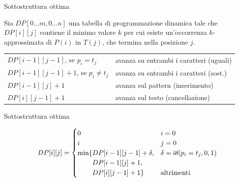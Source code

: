 \begin{frame}{Sottostruttura ottima}

\vspace{-9pt}
\begin{myboxtitle}[Definizione]
Sia $DP[0 \ldots m, 0 \ldots n]$ una tabella di programmazione dinamica
tale che $DP[i][j]$ contiene il minimo valore $k$ per cui esiste un'occorrenza $k$-approssimata di $P(i)$ in $T(j)$, che termina nella posizione $j$.
\end{myboxtitle}

\smallskip
\begin{tabular}{ll}
$DP[i-1][j-1]$, se $p_i = t_j$ &	avanza su entrambi i caratteri (uguali) \\
$DP[i-1][j-1]+1$, se $p_i \neq t_j$ &	avanza su entrambi i caratteri  (\alert{sost.}) \\
$DP[i-1][j]+1$				& avanza sul pattern (\alert{inserimento})\\
$DP[i][j-1]+1$				& avanza sul testo (\alert{cancellazione})\\
\end{tabular}

\end{frame}

\begin{frame}{Sottostruttura ottima}

\vspace{-9pt}
\[
DP[i][j] = \begin{cases}
0  & \textrm{$i=0$}\\
i  & \textrm{$j=0$}\\
\min\{ DP[i-1][j-1] + \delta, & \delta = \textsf{{\small iif}}(p_i=t_j,0,1)\\
\qquad\, DP[i-1][j] + 1,\\ 
\qquad\, DP[i][j-1] + 1\} & \textrm{altrimenti}
\end{cases}
\]

\begin{center}
\end{center}

\end{frame}


